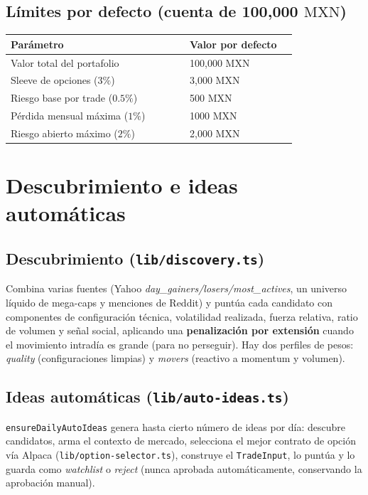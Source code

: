 \documentclass[11pt,letterpaper]{article}
\newcommand{\MXN}{\ensuremath{\mathrm{MXN}}}
\begin{document}
\subsection{Límites por defecto (cuenta de 100{,}000 \MXN)}
\begin{longtable}{p{0.50\linewidth} p{0.30\linewidth}}
\toprule
\textbf{Parámetro} & \textbf{Valor por defecto} \\
\midrule
Valor total del portafolio & 100{,}000 \MXN \\
Sleeve de opciones ($3\%$) & 3{,}000 \MXN \\
Riesgo base por trade ($0.5\%$) & 500 \MXN \\
Pérdida mensual máxima ($1\%$) & 1000 \MXN \\
Riesgo abierto máximo ($2\%$) & 2{,}000 \MXN \\
\bottomrule
\end{longtable}

\section{Descubrimiento e ideas automáticas}

\subsection{Descubrimiento (\texttt{lib/discovery.ts})}
Combina varias fuentes (Yahoo \emph{day\_gainers/losers/most\_actives}, un
universo líquido de mega-caps y menciones de Reddit) y puntúa cada candidato con
componentes de configuración técnica, volatilidad realizada, fuerza relativa,
ratio de volumen y señal social, aplicando una \textbf{penalización por
extensión} cuando el movimiento intradía es grande (para no perseguir). Hay dos
perfiles de pesos: \emph{quality} (configuraciones limpias) y \emph{movers}
(reactivo a momentum y volumen).

\subsection{Ideas automáticas (\texttt{lib/auto-ideas.ts})}
\texttt{ensureDailyAutoIdeas} genera hasta cierto número de ideas por día:
descubre candidatos, arma el contexto de mercado, selecciona el mejor contrato de
opción vía Alpaca (\texttt{lib/option-selector.ts}), construye el
\texttt{TradeInput}, lo puntúa y lo guarda como \emph{watchlist} o \emph{reject}
(nunca aprobada automáticamente, conservando la aprobación manual).
\end{document}
